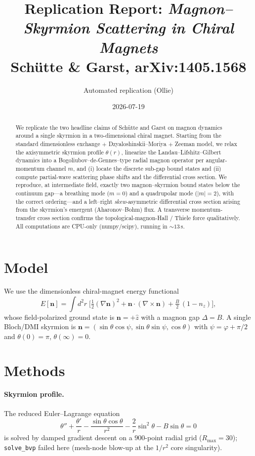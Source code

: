 \documentclass[11pt]{article}
\title{Replication Report: \emph{Magnon--Skyrmion Scattering in Chiral Magnets}\\
\large Sch\"utte \& Garst, arXiv:1405.1568}
\author{Automated replication (Ollie)}
\date{2026-07-19}
\begin{document}
\maketitle

\begin{abstract}
We replicate the two headline claims of Sch\"utte and Garst on magnon dynamics
around a single skyrmion in a two-dimensional chiral magnet. Starting from the
standard dimensionless exchange $+$ Dzyaloshinskii--Moriya $+$ Zeeman model, we
relax the axisymmetric skyrmion profile $\theta(r)$, linearize the
Landau--Lifshitz--Gilbert dynamics into a Bogoliubov--de-Gennes--type radial
magnon operator per angular-momentum channel $m$, and (i) locate the discrete
sub-gap bound states and (ii) compute partial-wave scattering phase shifts and
the differential cross section. We reproduce, at intermediate field, exactly two
magnon--skyrmion bound states below the continuum gap---a breathing mode
($m{=}0$) and a quadrupolar mode ($|m|{=}2$), with the correct ordering---and a
left--right \emph{skew}-asymmetric differential cross section arising from the
skyrmion's emergent (Aharonov--Bohm) flux. A transverse momentum-transfer cross
section confirms the topological-magnon-Hall / Thiele force qualitatively. All
computations are CPU-only (numpy/scipy), running in $\sim\!13$\,s.
\end{abstract}

\section{Model}
We use the dimensionless chiral-magnet energy functional
\begin{equation}
E[\mathbf n]=\int d^2r\;\Big[\tfrac12(\nabla\mathbf n)^2
+\mathbf n\cdot(\nabla\times\mathbf n)+\tfrac{B}{2}\,(1-n_z)\Big],
\end{equation}
whose field-polarized ground state is $\mathbf n=+\hat z$ with a magnon gap
$\Delta=B$. A single Bloch/DMI skyrmion is
$\mathbf n=(\sin\theta\cos\psi,\sin\theta\sin\psi,\cos\theta)$ with
$\psi=\varphi+\pi/2$ and $\theta(0)=\pi$, $\theta(\infty)=0$.

\section{Methods}
\paragraph{Skyrmion profile.} The reduced Euler--Lagrange equation
\begin{equation}
\theta''+\frac{\theta'}{r}-\frac{\sin\theta\cos\theta}{r^2}
-\frac{2}{r}\sin^2\theta-B\sin\theta=0
\end{equation}
is solved by damped gradient descent on a $900$-point radial grid
($R_{\max}{=}30$); \texttt{solve\_bvp} failed here (mesh-node blow-up at the
$1/r^2$ core singularity).
\end{document}
